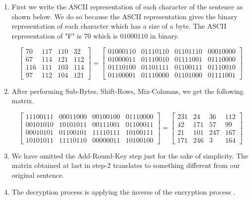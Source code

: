 \begin{enumerate}
\item First we write the ASCII representation of each character of the sentence as shown below. We do so because the ASCII representation gives the binary representation of each character which has a size of a byte. The ASCII representation of "F" is \(70\) which is \(01000110\) in binary.\vspace{2mm}

  \[\begin{bmatrix}
      70 & 117 & 110 & 32 \\
      67 & 114 & 121 & 112\\
      116 & 111 & 103 & 114 \\
      97 & 112 & 104 & 121
    \end{bmatrix}=
    \begin{bmatrix}
      01000110 & 01110110 & 01101110 & 00010000 \\
      01000011 & 01110010 & 01111001 & 01110000\\
      01110100 & 01101111 & 01100111 & 01110010 \\
      01100001 & 01110000 & 01101000 & 01111001
    \end{bmatrix}
  \]

  \vspace{5mm}

\item After performing Sub-Bytes, Shift-Rows, Mix-Columns, we get the following matrix. \vspace{2mm}

  \[\begin{bmatrix}
      11100111 & 00011000 & 00100100 & 01110000\\
      00101010 & 10101011 & 00111001 & 01100011\\
      00010101 & 01100101 & 11110111 & 10100111\\
      10101011 & 11110110 & 00000011 & 10100100
    \end{bmatrix}=
    \begin{bmatrix}
      231 & 24 & 36 & 112\\
      42 & 171 & 57 & 99\\
      21 & 101 & 247 & 167\\
      171 & 246 & 3 & 164
    \end{bmatrix}
  \]
  \vspace{5mm}

\item We have omitted the Add-Round-Key step just for the sake of simplicity. The matrix obtained at last in step-2 translates to something different from our original sentence.

  \vspace{5mm}

\item The decryption process is applying the inverse of the encryption process \cite{aes}.
\end{enumerate}
